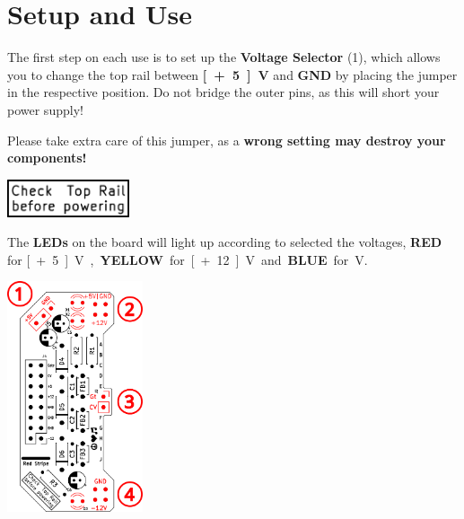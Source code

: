 \documentclass[a4paper,
               11pt,
               parskip=half,
               headinclude,
               titlepage=false]{scrartcl}
\begin{document}
\begin{minipage}[]{10.5cm}
\setlength{\parskip}{\medskipamount}
\section*{Setup and Use}

The first step on each use is to set up the \textbf{\color{red}Voltage Selector} (1), which allows you to change the top rail between \textbf{\unit[+5]V} and \textbf{GND} by placing the jumper in the respective position. Do not bridge the outer pins, as this will short your power supply!

Please take extra care of this jumper, as a \textbf{wrong setting may destroy your components!}


\begin{center}
\includegraphics[height=3em]{check-power-rail-warning}
\end{center}

The \textbf{LEDs} on the board will light up according to selected the voltages,
\textbf{\color{red}RED} for \unit[+5]V, \textbf{\color{orange!80}YELLOW} for \unit[+12]V and \textbf{\color{blue}BLUE} for \unit[-12]V.

\end{minipage}%
\hspace{0.5cm}
\begin{minipage}[]{4cm}
\vspace{-1cm}
\includegraphics[width=4cm]{eurorack-power-breakout-labels}
\end{minipage}

\vspace{2em}
\end{document}
